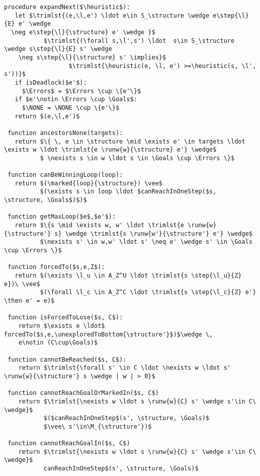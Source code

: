 \begin{lstlisting}[language={pseudocode},label={lst:dcs.aux},caption={auxiliary procedures.},float=ht]
 procedure expandNext($\heuristic$):
   let $\trimlst{(e,\l,e') \ldot e\in S_\structure \wedge e\step{\l}{E} e' \wedge   
  \neg e\step{\l}{\structure} e' \wedge }$ 
           $\trimlst{(\forall s,\l',s') \ldot  s\in S_\structure \wedge s\step{\l}{E} s' \wedge   
    \neg s\step{\l}{\structure} s' \implies}$ 
                  $\trimlst{\heuristic(e, \l, e') >=\heuristic(s, \l',   s'))}$
   if isDeadlock($e'$):
     $\Errors$ = $\Errors \cup \{e'\}$
   if $e'\notin \Errors \cup \Goals$:
     $\NONE = \NONE \cup \{e'\}$
   return $(e,\l,e')$
 
 function ancestorsNone(targets):
   return $\{ \, e \in \structure \mid \exists e' \in targets \ldot \exists w \ldot \trimlst{e \runw{w}{\structure} e'} \wedge$
          $ \nexists s \in w \ldot s \in \Goals \cup \Errors \}$
   
 function canBeWinningLoop(loop):
   return $(\marked{loop}{\structure}) \vee$ 
          $(\exists s \in loop \ldot $canReachInOneStep($s, \structure, \Goals$)$)$
   
 function getMaxLoop($e$,$e'$):
   return $\{s \mid \exists w, w' \ldot \trimlst{e \runw{w}{\structure'} s} \wedge \trimlst{s \runw{w'}{\structure'} e'} \wedge$ 
          $\nexists s' \in w,w' \ldot s' \neq e' \wedge s' \in \Goals \cup \Errors \}$

 function forcedTo($s,e,Z$):
   return $(\exists \l_u \in A_Z^U \ldot \trimlst{s \step{\l_u}{Z} e})\ \vee$
          $(\forall \l_c \in A_Z^C \ldot \trimlst{s \step{\l_c}{Z} e'} \then e' = e)$ 
          
 function isForcedToLose($s, C$):
    return $\exists e \ldot$ forcedTo($s,e,\unexploredToBottom{\structure'}$)$\wedge \,
    e\notin (C\cup\Goals)$
    
 function cannotBeReached($s, C$):
    return $\trimlst{\forall s' \in C \ldot \nexists w \ldot s' \runw{w}{\structure'} s \wedge | w | > 0}$
   
 function cannotReachGoalOrMarkedIn($s, C$)
    return $\trimlst{\nexists w \ldot s \runw{w}{C} s' \wedge s'\in C\ \wedge}$ 
           $($canReachInOneStep$(s', \structure, \Goals)$
           $\vee\ s'\in\M_{\structure'})$
           
 function cannotReachGoalIn($s, C$)
    return $\trimlst{\nexists w \ldot s \runw{w}{C} s' \wedge s'\in C\ \wedge}$ 
           canReachInOneStep$(s', \structure, \Goals)$
\end{lstlisting}